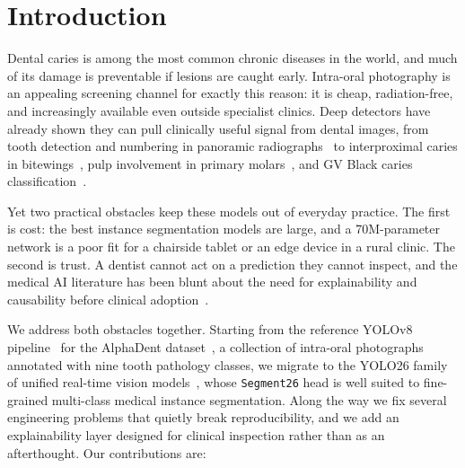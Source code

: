 \documentclass[conference]{IEEEtran}
\begin{document}
\section{Introduction}
Dental caries is among the most common chronic diseases in the world, and much of its damage is preventable if lesions are caught early. Intra-oral photography is an appealing screening channel for exactly this reason: it is cheap, radiation-free, and increasingly available even outside specialist clinics. Deep detectors have already shown they can pull clinically useful signal from dental images, from tooth detection and numbering in panoramic radiographs~\cite{tuzoff2019tooth} to interproximal caries in bitewings~\cite{bayati2025advanced}, pulp involvement in primary molars~\cite{sohrabi2025deep}, and GV Black caries classification~\cite{agulan2024detection}.

Yet two practical obstacles keep these models out of everyday practice. The first is cost: the best instance segmentation models are large, and a 70M-parameter network is a poor fit for a chairside tablet or an edge device in a rural clinic. The second is trust. A dentist cannot act on a prediction they cannot inspect, and the medical AI literature has been blunt about the need for explainability and causability before clinical adoption~\cite{holzinger2019causability, adadi2018peeking}.

We address both obstacles together. Starting from the reference YOLOv8 pipeline~\cite{jocher2023ultralytics} for the AlphaDent dataset~\cite{sosnin2025alphadent}, a collection of intra-oral photographs annotated with nine tooth pathology classes, we migrate to the YOLO26 family of unified real-time vision models~\cite{jocher2026yolo26}, whose \texttt{Segment26} head is well suited to fine-grained multi-class medical instance segmentation. Along the way we fix several engineering problems that quietly break reproducibility, and we add an explainability layer designed for clinical inspection rather than as an afterthought. Our contributions are:
\end{document}
